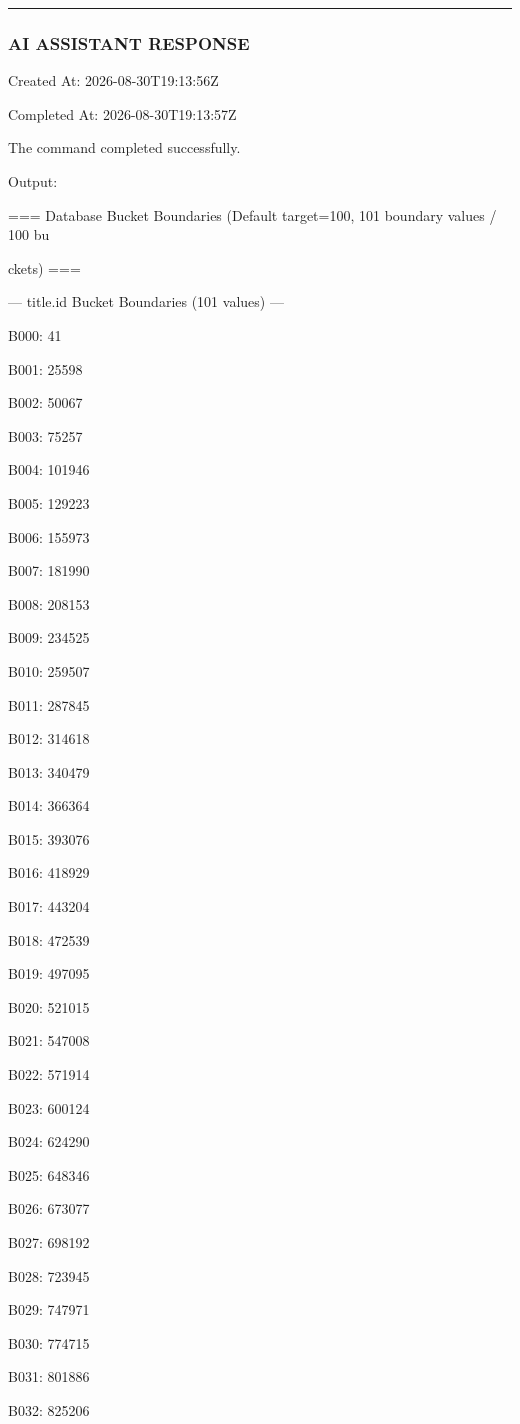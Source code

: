 \documentclass[11pt,a4paper]{article}
\begin{document}
{\hrule

\subsubsection{AI ASSISTANT RESPONSE}

Created At: 2026-08-30T19:13:56Z

Completed At: 2026-08-30T19:13:57Z


The command completed successfully.

Output:

=== Database Bucket Boundaries (Default target=100, 101 boundary values / 100 bu

ckets) ===


--- title.id Bucket Boundaries (101 values) ---

B000: 41

B001: 25598

B002: 50067

B003: 75257

B004: 101946

B005: 129223

B006: 155973

B007: 181990

B008: 208153

B009: 234525

B010: 259507

B011: 287845

B012: 314618

B013: 340479

B014: 366364

B015: 393076

B016: 418929

B017: 443204

B018: 472539

B019: 497095

B020: 521015

B021: 547008

B022: 571914

B023: 600124

B024: 624290

B025: 648346

B026: 673077

B027: 698192

B028: 723945

B029: 747971

B030: 774715

B031: 801886

B032: 825206

}
\end{document}
